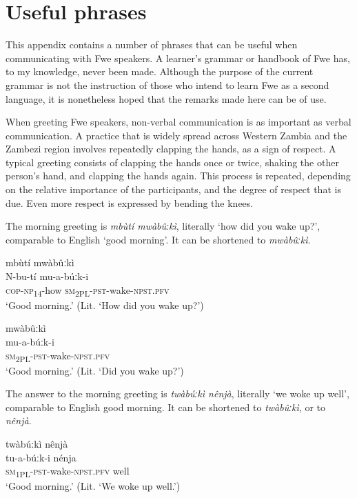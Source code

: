 \chapter{Useful phrases}
\hypertarget{Toc75352721}{}
This appendix contains a number of phrases that can be useful when communicating with Fwe speakers. A learner’s grammar or handbook of Fwe has, to my knowledge, never been made. Although the purpose of the current grammar is not the instruction of those who intend to learn Fwe as a second language, it is nonetheless hoped that the remarks made here can be of use.


When greeting Fwe speakers, non-verbal communication is as important as verbal communication. A practice that is widely spread across Western Zambia and the Zambezi region involves repeatedly clapping the hands, as a sign of respect. A typical greeting consists of clapping the hands once or twice, shaking the other person’s hand, and clapping the hands again. This process is repeated, depending on the relative importance of the participants, and the degree of respect that is due. Even more respect is expressed by bending the knees.

The morning greeting is \textit{mbùtí mwàbûːkì}, literally ‘how did you wake up?’, comparable to English ‘good morning’. It can be shortened to \textit{mwàbûːkì}.


\ea
mbùtí mwàbûːkì\\
\gll N-bu-tí    mu-a-búːk-i\\
\textsc{cop}{}-\textsc{np}\textsubscript{14}{}-how  \textsc{sm}\textsubscript{2PL}{}-\textsc{pst}{}-wake-\textsc{npst}.\textsc{pfv}\\
\glt ‘Good morning.’ (Lit. ‘How did you wake up?’)
\z

\ea
mwàbûːkì\\
\gll mu-a-búːk-i\\
\textsc{sm}\textsubscript{2PL}{}-\textsc{pst}{}-wake-\textsc{npst}.\textsc{pfv} \\
\glt ‘Good morning.’ (Lit. ‘Did you wake up?’)
\z



The answer to the morning greeting is \textit{twàbúːkì nênjà}, literally ‘we woke up well’, comparable to English good morning. It can be shortened to \textit{twàbûːkì}, or to \textit{nênjà}.


\ea
twàbúːkì nênjà\\
\gll tu-a-búːk-i      nénja\\
\textsc{sm}\textsubscript{1PL}{}-\textsc{pst}{}-wake-\textsc{npst}.\textsc{pfv}  well\\
\glt ‘Good morning.’ (Lit. ‘We woke up well.’)
\z


